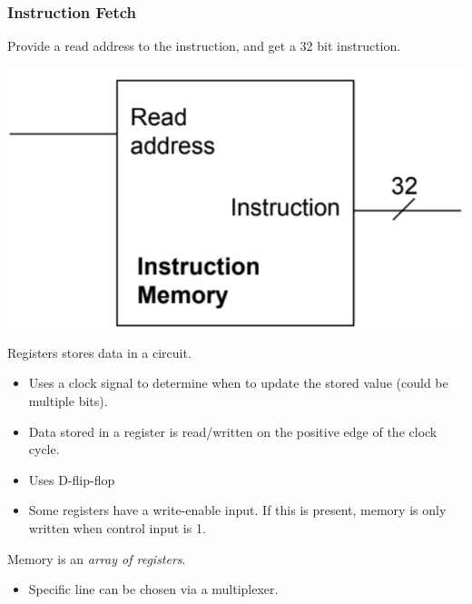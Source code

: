 \documentclass[10pt]{article}
\begin{document}
\subsubsection*{Instruction Fetch}
Provide a read address to the instruction, and get a 32 bit instruction.
\begin{center}
\includegraphics*[scale=0.8]{W2_3.png}
\end{center}
Registers stores data in a circuit. 
\begin{itemize}
    \item Uses a clock signal to determine when to update the stored value (could be multiple bits).
    \item Data stored in a register is read/written on the positive edge of the clock cycle.
    \item Uses D-flip-flop
    \item Some registers have a write-enable input.  If this is present, memory is only written when control input is 1.
\end{itemize}
Memory is an \textit{array of registers}.
\begin{itemize}
    \item Specific line can be chosen via a multiplexer.
\end{itemize}
\end{document}
